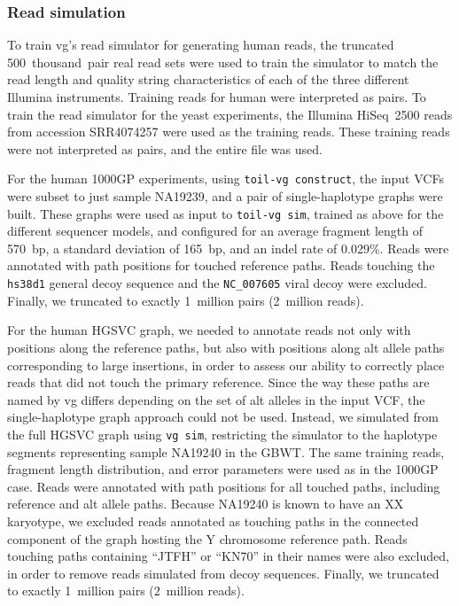 \documentclass[11pt]{ucscthesis}
\begin{document}
\subsubsection{Read simulation}
\label{subsec:readsim}

To train vg's read simulator for generating human reads, the truncated 500~thousand~pair real read sets were used to train the simulator to match the read length and quality string characteristics of each of the three different Illumina instruments.
Training reads for human were interpreted as pairs.
To train the read simulator for the yeast experiments, the Illumina HiSeq~2500 reads from accession SRR4074257 were used as the training reads.
These training reads were not interpreted as pairs, and the entire file was used.


For the human 1000GP experiments, using \texttt{toil-vg~construct}, the input VCFs were subset to just sample NA19239, and a pair of single-haplotype graphs were built.
These graphs were used as input to \texttt{toil-vg~sim}, trained as above for the different sequencer models, and configured for an average fragment length of 570~bp, a standard deviation of 165~bp, and an indel rate of 0.029\%.
Reads were annotated with path positions for touched reference paths.
Reads touching the \texttt{hs38d1} general decoy sequence and the \texttt{NC\_007605} viral decoy were excluded.
Finally, we truncated to exactly 1~million pairs (2~million reads).

For the human HGSVC graph, we needed to annotate reads not only with positions along the reference paths, but also with positions along alt allele paths corresponding to large insertions, in order to assess our ability to correctly place reads that did not touch the primary reference.
Since the way these paths are named by vg differs depending on the set of alt alleles in the input VCF, the single-haplotype graph approach could not be used.
Instead, we simulated from the full HGSVC graph using \texttt{vg~sim}, restricting the simulator to the haplotype segments representing sample NA19240 in the GBWT.
The same training reads, fragment length distribution, and error parameters were used as in the 1000GP case.
Reads were annotated with path positions for all touched paths, including reference and alt allele paths.
Because NA19240 is known to have an XX karyotype, we excluded reads annotated as touching paths in the connected component of the graph hosting the Y chromosome reference path.
Reads touching paths containing ``JTFH'' or ``KN70'' in their names were also excluded, in order to remove reads simulated from decoy sequences.
Finally, we truncated to exactly 1~million pairs (2~million reads).
\end{document}
